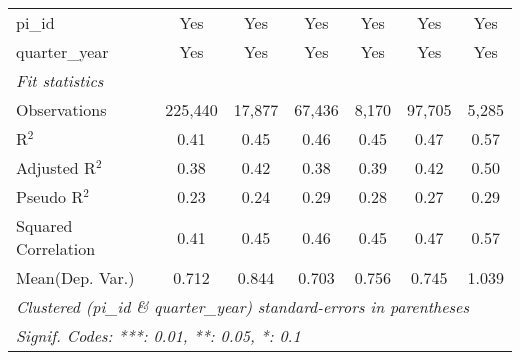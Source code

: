 \begin{tabular}{lcccccc}
   pi\_id                                                     & Yes           & Yes           & Yes           & Yes           & Yes           & Yes\\  
   quarter\_year                                              & Yes           & Yes           & Yes           & Yes           & Yes           & Yes\\  
   \midrule
   \emph{Fit statistics}\\
   Observations                                               & 225,440       & 17,877        & 67,436        & 8,170         & 97,705        & 5,285\\  
   R$^2$                                                      & 0.41          & 0.45          & 0.46          & 0.45          & 0.47          & 0.57\\  
   Adjusted R$^2$                                             & 0.38          & 0.42          & 0.38          & 0.39          & 0.42          & 0.50\\  
   Pseudo R$^2$                                               & 0.23          & 0.24          & 0.29          & 0.28          & 0.27          & 0.29\\  
   Squared Correlation                                        & 0.41          & 0.45          & 0.46          & 0.45          & 0.47          & 0.57\\  
Mean(Dep. Var.) & 0.712 & 0.844 & 0.703 & 0.756 & 0.745 & 1.039 \\
   \midrule \midrule
   \multicolumn{7}{l}{\emph{Clustered (pi\_id \& quarter\_year) standard-errors in parentheses}}\\
   \multicolumn{7}{l}{\emph{Signif. Codes: ***: 0.01, **: 0.05, *: 0.1}}\\
\end{tabular}
\par\endgroup
